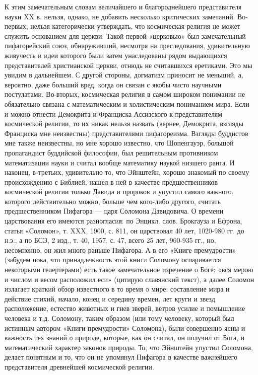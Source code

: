 К этим замечательным словам величайшего и благороднейшего
представителя науки XX в. нельзя, однако, не добавить несколько
критических замечаний. Во-первых, нельзя категорически утверждать, что
космическая религия не может служить основанием для церкви. Такой
первой «церковью» был замечательный пифагорейский союз, обнаруживший,
несмотря на преследования, удивительную живучесть и идеи которого были
затем унаследованы рядом выдающихся представителей христианской
церкви, отнюдь не считавшихся еретиками. Это мы увидим в дальнейшем. С
другой стороны, догматизм приносит не меньший, а, вероятно, даже
больший вред, когда он связан с якобы чисто научными постулатами.
Во-вторых, космическая религия в самом широком понимании не
обязательно связана с математическим и холистическим пониманием мира.
Если и можно отнести Демокрита и Франциска Ассизского к представителям
космической религии, то их никак нельзя назвать (вернее, Демокрита,
взгляды Франциска мне неизвестны) представителями пифагореизма.
Взгляды буддистов мне также неизвестны, но мне хорошо известно, что
Шопенгауэр, большой пропагандист буддийской философии, был решительным
противником математизации науки и считал вообще математику наукой
низшего ранга. И наконец, в-третьих, удивительно то, что Эйнштейн,
хорошо знакомый по своему происхождению с Библией, нашел в ней в
качестве предшественников космической религии только Давида и пророков
и упустил самого важного, которого действительно можно, больше чем
кого-либо другого, считать предшественником Пифагора --- царя Соломона
Давидовича. О времени царствования его имеются разногласия: по Энцикл.
слов. Брокгауза и Ефрона, статья «Соломон», т. XXX, 1900, с. 811, он
царствовал 40 лет, 1020-980 гг. до н.э., а по БСЭ, 2 изд., т. 40,
1957, с. 47, всего 25 лет, 960-935 гг., но, несомненно, он жил много
раньше Пифагора. А в его «Книге премудрости» (забудем пока, что
принадлежность этой книги Соломону оспаривается некоторыми
гелертерами) есть такое замечательное изречение о Боге: «вся мерою и
числом и весом расположил еси» (цитирую славянский текст), а далее
Соломон излагает краткий обзор известного в то время о мире:
составление мира и действие стихий, начало, конец и середину времен,
лет круги и звезд расположение, естество животных и гнев зверей,
ветров усилие и помышление человека и т.д. Соломону, таким образом
(или тому человеку, который был истинным автором «Книги премудрости»
Соломона), были совершенно ясны и важность тех знаний о природе,
которые, как он считал, он получил от Бога, и математический характер
законов природы. То, что Эйнштейн упустил Соломона, делает понятным и
то, что он не упомянул Пифагора в качестве важнейшего представителя
древнейшей космической религии.

